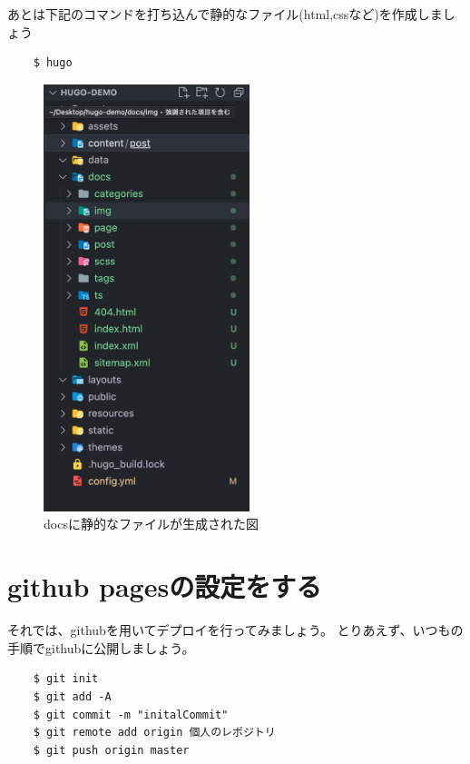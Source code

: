   あとは下記のコマンドを打ち込んで静的なファイル(html,cssなど)を作成しましょう


  \begin{shaded}
    \begin{verbatim}
    $ hugo
    \end{verbatim}
  \end{shaded}

  \begin{figure}[H]
    \centering
    \includegraphics[width=6cm]{./image/02-chap6/docs-genelate.png}
    \caption{docsに静的なファイルが生成された図}
    \label{chap6-docs-genelate-image}
  \end{figure}

\section{github pagesの設定をする}

  それでは、githubを用いてデプロイを行ってみましょう。
  とりあえず、いつもの手順でgithubに公開しましょう。

  \begin{shaded}
    \begin{verbatim}
    $ git init
    $ git add -A
    $ git commit -m "initalCommit"
    $ git remote add origin 個人のレポジトリ
    $ git push origin master
    \end{verbatim}
  \end{shaded}

